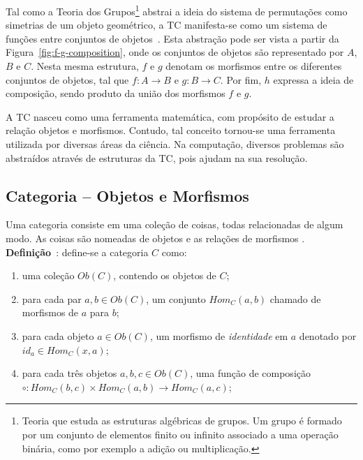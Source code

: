 \documentclass[10pt, conference]{IEEEtran}
\begin{document}
Tal como a Teoria dos Grupos\footnote{Teoria que estuda as estruturas algébricas de grupos. Um grupo é formado por um conjunto de elementos finito ou infinito associado a uma operação binária, como por exemplo a adição ou multiplicação.} abstrai a ideia do sistema de permutações como simetrias de um objeto geométrico, a TC manifesta-se como um sistema de funções entre conjuntos de objetos~\cite{awodey2010category}. Esta abstração pode ser vista a partir da Figura~\ref{fig:f-g-composition}, onde os conjuntos de objetos são representado por $A$, $B$ e $C$. Nesta mesma estrutura, $f$ e $g$ denotam os morfismos entre os diferentes conjuntos de objetos, tal que ${f: A \rightarrow B}$ e ${g: B \rightarrow C}$. Por fim, $h$ expressa a ideia de composição, sendo produto da união dos morfismos $f$ e $g$. 

A TC nasceu como uma ferramenta matemática, com propósito de estudar a relação objetos e morfismos. Contudo, tal conceito tornou-se uma ferramenta utilizada por diversas áreas da ciência. Na computação, diversos problemas são abstraídos através de estruturas da TC, pois ajudam na sua resolução.

\subsection{Categoria -- Objetos e Morfismos}
\label{subsec:sub-cat}
Uma categoria consiste em uma coleção de coisas, todas relacionadas de algum modo. As coisas são nomeadas de objetos e as relações de morfismos \cite{spivak2014cts}.\\

\textbf{Definição}~\cite{spivak2014cts, maclane1971mat}: define-se a categoria $C$ como:

\begin{enumerate}[label=(\alph*), leftmargin=3em, topsep = 0pt, itemsep = 1ex, partopsep = 1ex, parsep = 1ex]
	\item uma coleção ${Ob(C)}$, contendo os objetos de $C$;
	\item para cada par ${a, b \in Ob(C)}$, um conjunto ${Hom_C(a, b)}$ chamado de morfismos de $a$ para $b$;
	\item para cada objeto ${a \in Ob(C)}$, um morfismo de \textit{identidade} em $a$ denotado por ${id_a \in Hom_C(x, a)}$;
	\item para cada três objetos ${a, b, c \in Ob(C)}$, uma função de composição $\circ: Hom_C(b, c) \times Hom_C(a, b) \rightarrow Hom_C(a, c)$;
\end{enumerate}
\end{document}
